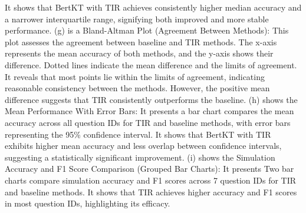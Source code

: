\begin{figure*}
{It shows that BertKT with TIR achieves consistently higher median accuracy and a narrower interquartile range, signifying both improved and more stable performance.
(g) is a Bland-Altman Plot (Agreement Between Methods):
This plot assesses the agreement between baseline and TIR methods. The x-axis represents the mean accuracy of both methods, and the y-axis shows their difference. Dotted lines indicate the mean difference and the limits of agreement.
It reveals that most points lie within the limits of agreement, indicating reasonable consistency between the methods. However, the positive mean difference suggests that TIR consistently outperforms the baseline.
(h) shows the Mean Performance With Error Bars:
It presents a bar chart compares the mean accuracy across all question IDs for TIR and baseline methods, with error bars representing the 95\% confidence interval.
It shows that BertKT with TIR exhibits higher mean accuracy and less overlap between confidence intervals, suggesting a statistically significant improvement.
(i) shows the Simulation Accuracy and F1 Score Comparison (Grouped Bar Charts):
It presents Two bar charts compare simulation accuracy and F1 scores across 7 question IDs for TIR and baseline methods.
It shows that TIR achieves higher accuracy and F1 scores in most question IDs, highlighting its efficacy. 
}
\label{question correlation}
\end{figure*}


